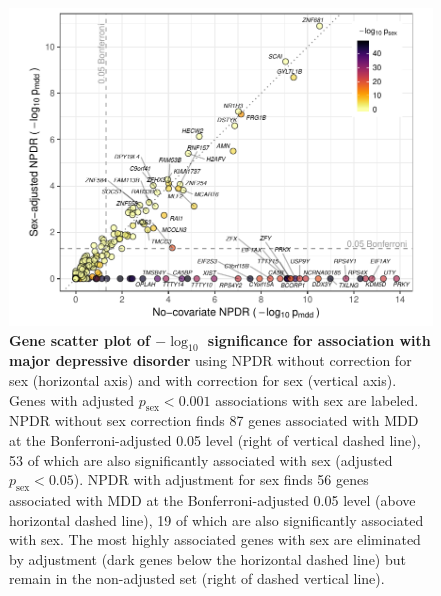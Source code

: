 \documentclass[10pt]{article}
\begin{document}
\begin{figure}[!tpb]%
\centerline{\includegraphics[]{../figs/mostafavi_npdrs_mdd.pdf}}
\caption{{\bf Gene scatter plot of $-\log_{10}$ significance for association with major depressive disorder}
using NPDR without correction for sex (horizontal axis) and with correction for sex (vertical axis). Genes with adjusted $p_\textrm{sex} < 0.001$ associations with sex are labeled. NPDR without sex correction finds 87 genes associated with MDD at the Bonferroni-adjusted 0.05 level (right of vertical dashed line), 53 of which are also significantly associated with sex (adjusted $p_\textrm{sex} < 0.05$).  NPDR with adjustment for sex finds 56 genes associated with MDD at the Bonferroni-adjusted 0.05 level (above horizontal dashed line), 19 of which are also significantly associated with sex. The most highly associated genes with sex are eliminated by adjustment (dark genes below the horizontal dashed line) but remain in the non-adjusted set (right of dashed vertical line). }
\label{fig:npdrs_mdd}
\end{figure}
\end{document}
